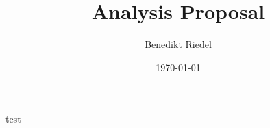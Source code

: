 \documentclass{article}
\title{Analysis Proposal}
\author{Benedikt Riedel}
\date{\today}
\begin{document}
\maketitle
test



\end{document}
